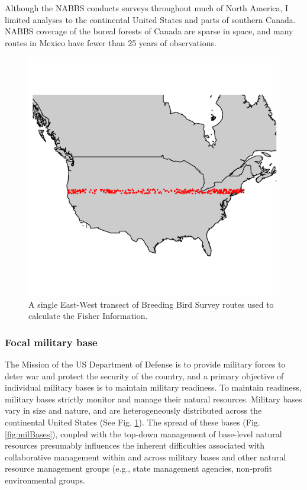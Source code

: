 \documentclass[12pt,twoside,openany]{reedthesis}
\begin{document}
Although the NABBS conducts surveys throughout much of North America, I limited analyses to the continental United States and parts of southern Canada. NABBS coverage of the boreal forests of Canada are sparse in space, and many routes in Mexico have fewer than 25 years of observations.
\begin{figure}
\includegraphics[width=0.85\linewidth]{./chapterFiles/fisherSpatial/figures/figsCalledInDiss/transectSamplingEx_1row} \caption{A single East-West transect of Breeding Bird Survey routes used to calculate the Fisher Information.}\label{fig:ewRouteMap}
\end{figure}
\hypertarget{focal-military-base}{%
\subsubsection{Focal military base}\label{focal-military-base}}

The Mission of the US Department of Defense is to provide military forces to deter war and protect the security of the country, and a primary objective of individual military bases is to maintain military readiness. To maintain readiness, military bases strictly monitor and manage their natural resources. Military bases vary in size and nature, and are heterogeneously distributed across the continental United States (See Fig. \ref{fig:ewRouteMap}). The spread of these bases (Fig. \ref{fig:milBases}), coupled with the top-down management of base-level natural resources presumably influences the inherent difficulties associated with collaborative management within and across military bases and other natural resource management groups (e.g., state management agencies, non-profit environmental groups.
\end{document}
